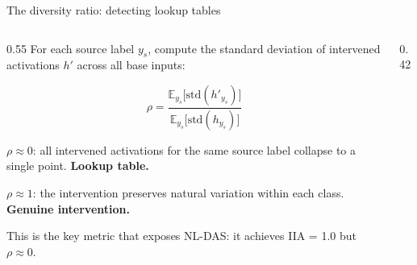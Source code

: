 \documentclass[aspectratio=169,11pt]{beamer}
\begin{document}
\begin{frame}{The diversity ratio: detecting lookup tables}

\begin{columns}[T]
\begin{column}{0.55\textwidth}
{\small For each source label $y_s$, compute the standard deviation of intervened activations $h'$ across all base inputs:}

$$\rho = \frac{\mathbb{E}_{y_s}\bigl[\text{std}(h'_{y_s})\bigr]}{\mathbb{E}_{y_s}\bigl[\text{std}(h_{y_s})\bigr]}$$

\vspace{0.3em}
{\small $\rho \approx 0$: all intervened activations for the same source label collapse to a single point. \textbf{Lookup table.}}

\vspace{0.3em}
{\small $\rho \approx 1$: the intervention preserves natural variation within each class. \textbf{Genuine intervention.}}

\vspace{0.3em}
{\small This is the key metric that exposes NL-DAS: it achieves IIA = 1.0 but $\rho \approx 0$.}
\end{column}
\begin{column}{0.42\textwidth}
\end{column}
\end{columns}
\end{frame}
\end{document}
